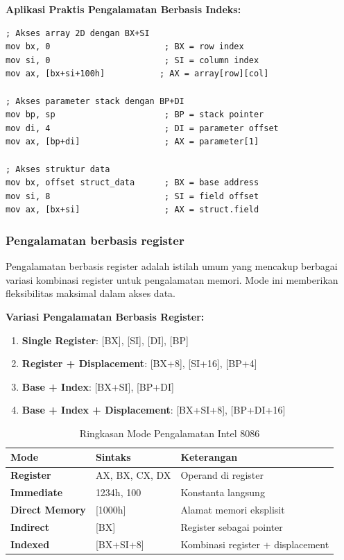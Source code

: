 \documentclass[../main.tex]{subfiles}
\begin{document}
\textbf{Aplikasi Praktis Pengalamatan Berbasis Indeks:}
\begin{lstlisting}[language={[x86masm]Assembler}, caption=Aplikasi Praktis Pengalamatan Berbasis Indeks, label=lst:indexed-applications]
; Akses array 2D dengan BX+SI
mov bx, 0                       ; BX = row index
mov si, 0                       ; SI = column index
mov ax, [bx+si+100h]           ; AX = array[row][col]

; Akses parameter stack dengan BP+DI
mov bp, sp                      ; BP = stack pointer
mov di, 4                       ; DI = parameter offset
mov ax, [bp+di]                 ; AX = parameter[1]

; Akses struktur data
mov bx, offset struct_data      ; BX = base address
mov si, 8                       ; SI = field offset
mov ax, [bx+si]                 ; AX = struct.field
\end{lstlisting}

            \subsubsection{Pengalamatan berbasis register}
Pengalamatan berbasis register adalah istilah umum yang mencakup berbagai variasi kombinasi register untuk pengalamatan memori. Mode ini memberikan fleksibilitas maksimal dalam akses data.

\textbf{Variasi Pengalamatan Berbasis Register:}
\begin{enumerate}
    \item \textbf{Single Register}: [BX], [SI], [DI], [BP]
    \item \textbf{Register + Displacement}: [BX+8], [SI+16], [BP+4]
    \item \textbf{Base + Index}: [BX+SI], [BP+DI]
    \item \textbf{Base + Index + Displacement}: [BX+SI+8], [BP+DI+16]
\end{enumerate}

\begin{table}[H]
    \centering
    \caption{Ringkasan Mode Pengalamatan Intel 8086}
    \begin{tabular}{|p{3.2cm}|p{3.8cm}|p{7cm}|}
        \hline
        \textbf{Mode} & \textbf{Sintaks} & \textbf{Keterangan} \\
        \hline
        \textbf{Register} & AX, BX, CX, DX & Operand di register \\
        \hline
        \textbf{Immediate} & 1234h, 100 & Konstanta langsung \\
        \hline
        \textbf{Direct Memory} & [1000h] & Alamat memori eksplisit \\
        \hline
        \textbf{Indirect} & [BX] & Register sebagai pointer \\
        \hline
        \textbf{Indexed} & [BX+SI+8] & Kombinasi register + displacement \\
        \hline
    \end{tabular}
    \label{tab:addressing-modes-summary}
\end{table}
\end{document}
